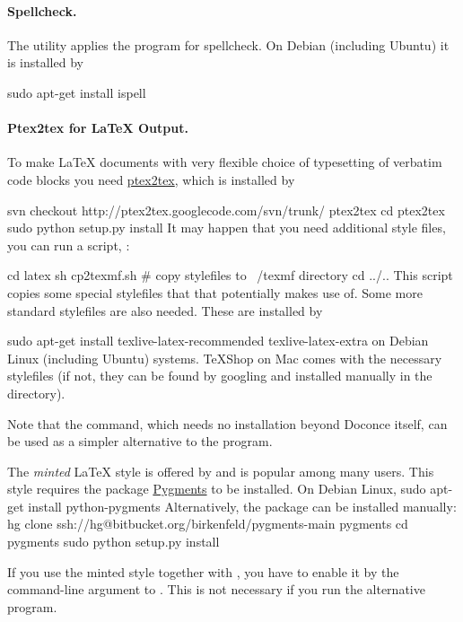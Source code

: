 \documentclass[%
oneside,                 %
final,                   %
chapterprefix=true,      %
open=right               %
10pt]{book}
\begin{document}
\paragraph{Spellcheck.}
The utility  applies the  program for
spellcheck. On Debian (including Ubuntu) it is installed by

\bsys
sudo apt-get install ispell
\esys

\paragraph{Ptex2tex for {\LaTeX} Output.}
To make {\LaTeX} documents with very flexible choice of typesetting of
verbatim code blocks you need \href{{http://code.google.com/p/ptex2tex}}{ptex2tex},
which is installed by

\bsys
svn checkout http://ptex2tex.googlecode.com/svn/trunk/ ptex2tex
cd ptex2tex
sudo python setup.py install
\esys
It may happen that you need additional style files, you can run
a script, :

\bsys
cd latex
sh cp2texmf.sh  # copy stylefiles to ~/texmf directory
cd ../..
\esys
This script copies some special stylefiles that
that  potentially makes use of. Some more standard stylefiles
are also needed. These are installed by

\bsys
sudo apt-get install texlive-latex-recommended texlive-latex-extra
\esys
on Debian Linux (including Ubuntu) systems. TeXShop on Mac comes with
the necessary stylefiles (if not, they can be found by googling and installed
manually in the  directory).

Note that the  command, which needs no installation
beyond Doconce itself, can be used as a simpler alternative to the 
program.

The \emph{minted} {\LaTeX} style is offered by  and 
is popular among many
users. This style requires the package \href{{http://pygments.org}}{Pygments}
to be installed. On Debian Linux,
\bsys
sudo apt-get install python-pygments
\esys
Alternatively, the package can be installed manually:
\bsys
hg clone ssh://hg@bitbucket.org/birkenfeld/pygments-main pygments
cd pygments
sudo python setup.py install
\esys

If you use the minted style together with , you have to
enable it by the  command-line argument to .
This is not necessary if you run the alternative  program.
\end{document}
